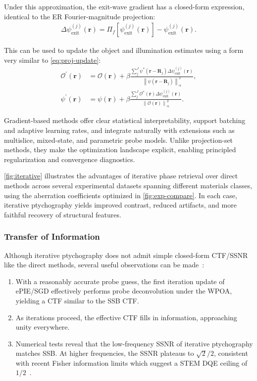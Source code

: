 \documentclass[pdflatex,sn-aps,iicol]{sn-jnl}%
\begin{document}
Under this approximation, the exit-wave gradient has a closed-form expression, identical to the ER Fourier-magnitude projection:
\begin{align}
\Delta \psi_{\text{exit}}^{(j)}(\boldsymbol{r})
=
\Pi_f\!\left[
\psi_{\text{exit}}^{(j)}(\boldsymbol{r})
\right]
-
\psi_{\text{exit}}^{(j)}(\boldsymbol{r}).
\label{eq:gd}
\end{align}

This can be used to update the object and illumination estimates using a form very similar to \cref{eq:proj-update}:
\begin{align}
\mathcal{O}^{' }(\boldsymbol{r})
&=
\mathcal{O}(\boldsymbol{r})
+
\beta
\frac{
\sum_j^J
\psi^{*}(\boldsymbol{r}-\boldsymbol{R}_j)
\Delta \psi_{\text{exit}}^{(j)}(\boldsymbol{r})
}{
\left\lVert
\psi(\boldsymbol{r}-\boldsymbol{R}_j)
\right\rVert^2_{\alpha}
},\\
\psi^{' }(\boldsymbol{r})
&=
\psi(\boldsymbol{r})
+
\beta
\frac{
\sum_j^J
\mathcal{O}^{*}(\boldsymbol{r})
\Delta \psi_{\text{exit}}^{(j)}(\boldsymbol{r})
}{
\left\lVert
\mathcal{O}(\boldsymbol{r})
\right\rVert^2_{\alpha}
}.
\label{eq:sgd-update}
\end{align}

Gradient-based methods offer clear statistical interpretability, support batching and adaptive learning rates, and integrate naturally with extensions such as multislice, mixed-state, and parametric probe models.
Unlike projection-set methods, they make the optimization landscape explicit, enabling principled regularization and convergence diagnostics.

\cref{fig:iterative} illustrates the advantages of iterative phase retrieval over direct methods across several experimental datasets spanning different materials classes, using the aberration coefficients optimized in \cref{fig:exp-compare}.
In each case, iterative ptychography yields improved contrast, reduced artifacts, and more faithful recovery of structural features.

\subsubsection{Transfer of Information}

Although iterative ptychography does not admit simple closed-form CTF/SSNR like the direct methods, several useful observations can be made~\cite{Varnavides_2025_ssnr}:

\begin{enumerate}
\item With a reasonably accurate probe guess, the first iteration update of ePIE/SGD effectively performs probe deconvolution under the WPOA, yielding a CTF similar to the SSB CTF.
\item As iterations proceed, the effective CTF fills in information, approaching unity everywhere.
\item Numerical tests reveal that the low-frequency SSNR of iterative ptychography matches SSB.
At higher frequencies, the SSNR plateaus to $\sqrt{2}/2$, consistent with recent Fisher information limits which suggest a STEM DQE ceiling of $1/2$~\cite{Dwyer_2024,Vega_2025,Varnavides_2025_ssnr}.
\end{enumerate}
\end{document}
